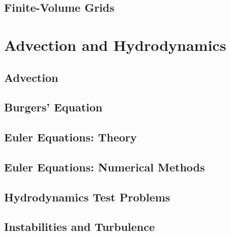 \documentclass[11pt]{book}
\begin{document}
\chapter{Finite-Volume Grids}



\part{Advection and Hydrodynamics}

\chapter{Advection}



\chapter{Burgers' Equation}



\chapter{Euler Equations: Theory}




\chapter{Euler Equations: Numerical Methods}




\ifdefined\debugmode
\chapter{Hydrodynamics Test Problems}




\chapter{Instabilities and Turbulence}


\end{document}

